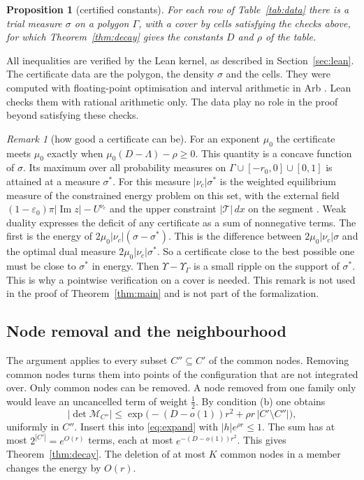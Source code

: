 \documentclass[11pt]{amsart}
\newtheorem{proposition}[theorem]{Proposition}
\theoremstyle{definition}
\theoremstyle{remark}
\newtheorem{remark}[theorem]{Remark}
\numberwithin{equation}{section}
\renewcommand{\Im}{\operatorname{Im}}
\begin{document}
\begin{proposition}[certified constants]\label{prop:cert}
For each row of Table~\ref{tab:data} there is a trial measure $\sigma$ on a polygon $\Gamma$, with a cover by cells
satisfying the checks above, for which Theorem~\ref{thm:decay} gives the constants $D$ and $\rho$ of the table.
\end{proposition}

All inequalities are verified by the Lean kernel, as described in Section~\ref{sec:lean}. The certificate data are the
polygon, the density $\sigma$ and the cells. They were computed with floating-point optimisation and interval arithmetic
in Arb \cite{Arb}. Lean checks them with rational arithmetic only. The data play no role in the proof beyond satisfying these
checks.

\begin{remark}[how good a certificate can be]\label{rem:certlimit}
For an exponent $\mu_0$ the certificate meets $\mu_0$ exactly when $\mu_0(D-\Lambda)-\rho\ge0$. This quantity is a concave function
of $\sigma$. Its maximum over all probability measures on $\Gamma\cup[-r_0,0]\cup[0,1]$ is attained at a measure
$\sigma^*$. For this measure $|\nu_c|\sigma^*$ is the weighted equilibrium measure of the constrained energy problem on
this set, with the external field $(1-\varepsilon_0)\pi|\Im z|-U^{\nu_c}$ and the upper constraint $|\mathcal T|\,dx$ on
the segment \cite{SaffTotik}. Weak duality expresses the deficit of any certificate as a sum of nonnegative terms. The
first is the energy of $2\mu_0|\nu_c|(\sigma-\sigma^*)$. This is the difference between $2\mu_0|\nu_c|\sigma$ and the optimal
dual measure $2\mu_0|\nu_c|\sigma^*$. So a certificate close to the best possible one must be close to $\sigma^*$ in energy.
Then $\Upsilon-\Upsilon_\Gamma$ is a small ripple on the support of $\sigma^*$. This is why a pointwise verification on a
cover is needed. This remark is not used in the proof of Theorem~\ref{thm:main} and is not part of the formalization.
\end{remark}

\subsection{Node removal and the neighbourhood}
The argument applies to every subset $C''\subseteq C'$ of the common nodes. Removing common nodes turns them into points
of the configuration that are not integrated over. Only common nodes can be removed. A node removed from one family only
would leave an uncancelled term of weight $\frac12$. By condition (b) one obtains
\[
 |\det\mathcal M_{C''}|\le\exp\bigl(-(D-o(1))r^2+\rho r\,|C'\setminus C''|\bigr),
\]
uniformly in $C''$. Insert this into \eqref{eq:expand} with $|h|e^{\rho r}\le1$. The sum has at most
$2^{|C'|}=e^{O(r)}$ terms, each at most $e^{-(D-o(1))r^2}$. This gives Theorem~\ref{thm:decay}. The deletion of at most
$K$ common nodes in a member changes the energy by $O(r)$.
\end{document}
